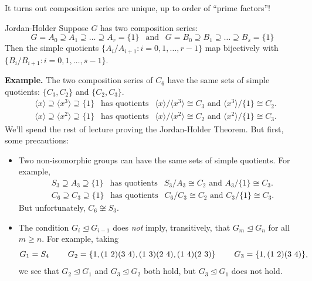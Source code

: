 It turns out composition series are unique, up to order of ``prime factors''!

\begin{theorem}{Jordan-Holder}
    Suppose $G$ has two composition series:
    \[ G = A_0 \supseteq A_1 \supseteq \dots \supseteq A_r = \{1\} ~~ \text{ and } ~~ G = B_0 \supseteq B_1 \supseteq \dots \supseteq B_s = \{1\} \]
    Then the simple quotients $\{A_i / A_{i + 1}:  i = 0, 1, \dots, r - 1\}$ map bijectively with $\{B_i / B_{i + 1} :  i = 0, 1, \dots, s - 1\}$.
\end{theorem}

\textbf{Example.} The two composition series of $C_6$ have the same sets of simple quotients: $\{C_3, C_2\}$ and $\{C_2, C_3\}$.
\begin{align*} & \langle x \rangle \supseteq \langle x^3 \rangle \supseteq \{1\} ~~ \text{ has quotients } ~~ \langle x \rangle / \langle x^3 \rangle \cong C_3 \text{ and } \langle x^3 \rangle / \{1 \} \cong C_2. \\
& \langle x \rangle \supseteq \langle x^2 \rangle \supseteq \{1 \} ~~ \text{ has quotients } ~~ \langle x \rangle / \langle x^2 \rangle \cong C_2 \text{ and } \langle x^2 \rangle / \{1 \} \cong C_3. \end{align*}
We'll spend the rest of lecture proving the Jordan-Holder Theorem.  But first, some precautions:
\begin{itemize}
    \item Two non-isomorphic groups can have the same sets of simple quotients.  For example,
    \begin{align*} & S_3 \supseteq A_3 \supseteq \{1\} ~~ \text{ has quotients } ~~ S_3 / A_3 \cong C_2 \text{ and } A_3 / \{1\} \cong C_3. \\
    & C_6 \supseteq C_3 \supseteq \{1\} ~~ \text{ has quotients } ~~ C_6 / C_3 \cong C_2 \text{ and } C_3 / \{1\} \cong C_3. \end{align*}
    But unfortunately, $C_6 \not \cong S_3$.
    \item The condition $G_i \unlhd G_{i - 1}$ does \emph{not} imply, transitively, that $G_m \unlhd G_n$ for all $m \geq n$.  For example, taking
    \[ G_1 = S_4 \hspace{0.8cm} G_2 = \{1, ( 1\ 2)(3 \ 4), (1 \ 3)(2 \ 4), (1 \ 4)(2 \ 3)\} \hspace{0.8cm} G_3 = \{1, (1 \ 2)(3 \ 4)\}, \]
    we see that $G_2 \unlhd G_1$ and $G_3 \unlhd G_2$ both hold, but $G_3 \unlhd G_1$ does not hold.
\end{itemize}

